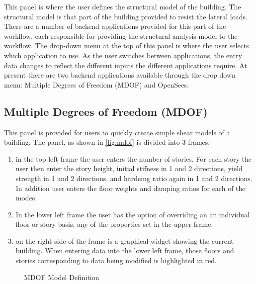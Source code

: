 This panel is where the user defines the structural model of the
building. The structural model is that part of the building provided
to resist the lateral loads. There are a number of backend
applications provided for this part of the workflow, each responsible
for providing the structural analysis model to the workflow. The
drop-down menu at the top of this panel is where the user selects
which application to use. As the user switches between applications,
the entry data changes to reflect the different inputs the different
applications require. At present there are two backend applications
available through the drop down menu: Multiple Degrees of Freedom
(MDOF) and OpenSees.

\subsection{Multiple Degrees of Freedom (MDOF)}

This panel is provided for users to quickly create simple shear models
of a building. The panel, as shown in \autoref{fig:mdof} is divided
into 3 frames:
\begin{enumerate}
\item in the top left frame the user enters the number of stories. For
  each story the user then enter the story height, initial stifness in
  1 and 2 directions, yield strength in 1 and 2 directions, and
  hardeing ratio again in 1 and 2 directions. In addition user enters
  the floor weights and damping ratios for each of the modes.
\item In the lower left frame the user has the option of overriding an
  an individual floor or story basis, any of the properties set in the
  upper frame.
\item on the right side of the frame is a graphical widget showing the
  current building. When entering data into the lower left frame,
  those floors and stories corresponding to data being modified is
  highlighted in red.
\end{enumerate}

\begin{figure}[!htbp]
  \caption{MDOF Model Definition}
  \label{fig:mdof}
\end{figure}

